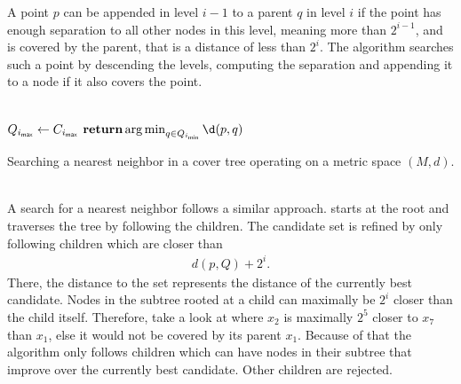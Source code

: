 	A point $p$ can be appended in level $i - 1$ to a parent $q$ in level $i$ if the point has enough separation to all other
	nodes in this level, meaning more than $2^{i - 1}$, and is covered by the parent, that is a distance of less than $2^i$.
	The algorithm searches such a point by descending the levels, computing the separation and appending it to a
	node if it also covers the point.\\\\
	\IncMargin{1em}
	\begin{algorithm}
		\BlankLine
		\BlankLine
		$Q_{i_{\textsf{max}}} \leftarrow C_{i_{\textsf{max}}}$\;
		$\Return \argmin_{q \in Q_{i_{\vmin}}} \d(p, q)$\;
		\BlankLine
		\caption{Searching a nearest neighbor in a cover tree operating on a metric space $(M, d)$.}\label{coverTreeSearch}
	\end{algorithm}\DecMargin{1em}\quad\\
	A search for a nearest neighbor follows a similar approach.  starts at the root and traverses
	the tree by following the children. The candidate set is refined by only following children which are closer than
	\begin{align*}
		d(p, Q) + 2^i.
	\end{align*}
	There, the distance to the set represents the distance of the currently best candidate. Nodes in the subtree
	rooted at a child can maximally be $2^i$ closer than the child itself. Therefore, take a look
	at  where $x_2$ is maximally $2^5$ closer to $x_7$ than $x_1$, else it would not
	be covered by its parent $x_1$.
	Because of that the algorithm only follows children which can have nodes in their subtree
	that improve over the currently best candidate. Other children are rejected.
	
